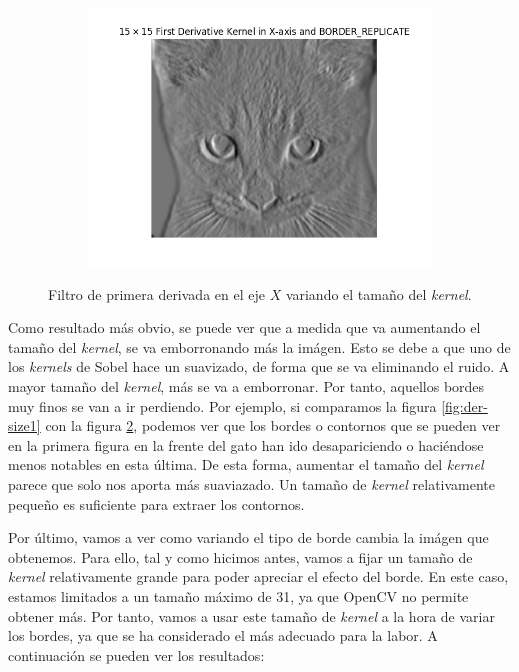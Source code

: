 \documentclass[11pt,a4paper]{article}
\begin{document}
\begin{figure}[H]
\begin{subfigure}{.5\textwidth}
	\label{fig:der-size2}
\end{subfigure}
\begin{subfigure}{\textwidth}
	\centering
	\includegraphics[scale=0.46]{img/der-size3.png}
	\label{fig:der-size3}
\end{subfigure}
\caption{Filtro de primera derivada en el eje $X$ variando el tamaño del \textit{kernel}.}
\label{fig:der-size}
\end{figure}

Como resultado más obvio, se puede ver que a medida que va aumentando el tamaño del \textit{kernel}, se va emborronando más
la imágen. Esto se debe a que uno de los \textit{kernels} de Sobel hace un suavizado, de forma que se va eliminando el ruido.
A mayor tamaño del \textit{kernel}, más se va a emborronar. Por tanto, aquellos bordes muy finos se van a ir perdiendo. Por
ejemplo, si comparamos la figura \ref{fig:der-size1} con la figura \ref{fig:der-size3}, podemos ver que los bordes o contornos
que se pueden ver en la primera figura en la frente del gato han ido desapariciendo o haciéndose menos notables en esta última.
De esta forma, aumentar el tamaño del \textit{kernel} parece que solo nos aporta más suaviazado. Un tamaño de \textit{kernel}
relativamente pequeño es suficiente para extraer los contornos.

Por último, vamos a ver como variando el tipo de borde cambia la imágen que obtenemos. Para ello, tal y como hicimos antes, vamos
a fijar un tamaño de \textit{kernel} relativamente grande para poder apreciar el efecto del borde. En este caso, estamos limitados
a un tamaño máximo de 31, ya que OpenCV no permite obtener más. Por tanto, vamos a usar este tamaño de \textit{kernel} a la hora
de variar los bordes, ya que se ha considerado el más adecuado para la labor. A continuación se pueden ver los resultados:
\end{document}
